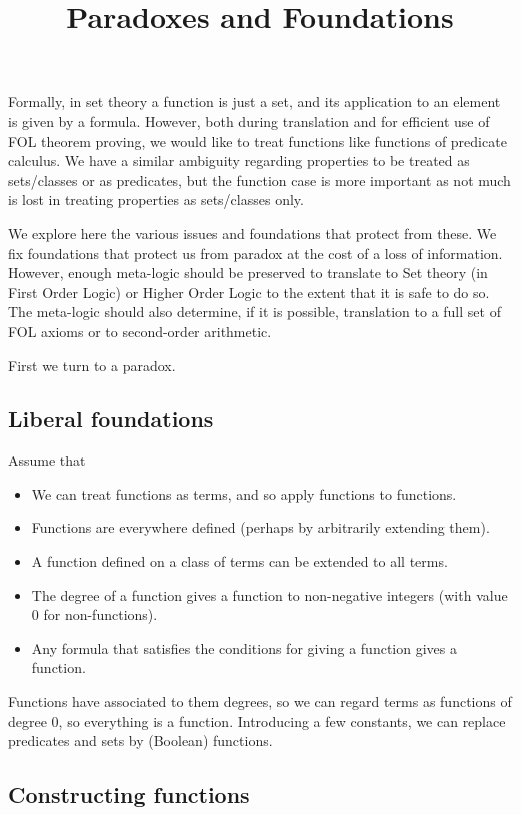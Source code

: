 \documentclass{amsart}
\begin{document}
\title{Paradoxes and  Foundations}
\maketitle

Formally, in set theory a function is just a set, and its application to an element is given by a formula. However, both during translation and for efficient use of FOL theorem proving, we would like to treat functions like functions of predicate calculus. We have a similar ambiguity regarding properties to be treated as sets/classes or as predicates, but the function case is more important as not much is lost in treating properties as sets/classes only.

We explore here the various issues and foundations that protect from these. We fix foundations that protect us from paradox at the cost of a loss of information. However, enough meta-logic should be preserved to translate to Set theory (in First Order Logic) or Higher Order Logic to the extent that it is safe to do so. The meta-logic should also determine, if it is possible, translation to a full set of FOL axioms or to second-order arithmetic.

First we turn to a paradox.

\subsection*{Liberal foundations}

Assume that
\begin{itemize}
\item We can treat functions as terms, and so apply functions to functions. 
\item Functions are everywhere defined (perhaps by arbitrarily extending them).
\item A function defined on a class of terms can be extended to all terms.
\item The degree of a function gives a function to non-negative integers (with value $0$ for non-functions).
\item Any formula that satisfies the conditions for giving a function gives a function.
\end{itemize}
 
Functions have associated to them degrees, so we can regard terms as functions of degree $0$, so everything is a function. Introducing a few constants, we can replace predicates and sets by (Boolean) functions.

\subsection*{Constructing functions}
\end{document}
